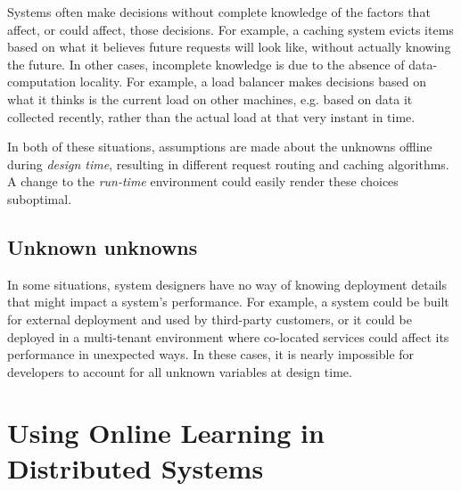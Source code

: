 \documentclass[a4paper,twocolumn]{article}
\newcommand{\ignore}[1]{}
\begin{document}
Systems often make decisions without complete knowledge of the factors that
affect, or could affect, those decisions.  For example, a caching system evicts
items based on what it believes future requests will look like, without actually
knowing the future.  In other cases, incomplete knowledge is due to the absence
of data-computation locality.  For example, a load balancer makes decisions
based on what it thinks is the current load on other machines, e.g. based on
data it collected recently, rather than the actual load at that very instant in
time.

In both of these situations, assumptions are made about the unknowns offline
during \emph{design time}, resulting in different request routing and caching
algorithms. A change to the \emph{run-time} environment could easily render
these choices suboptimal.

\ignore{
Online learning has the potential to make these decisions online, based on current contexts,
and can be nimble in adapting to any changes to the run-time
environment.
}

\subsection*{Unknown unknowns}

In some situations, system designers have no way of knowing deployment details
that might impact a system's performance. For example, a system could be built
for external deployment and used by third-party customers, or it could be
deployed in a multi-tenant environment where co-located services could affect
its performance in unexpected ways. In these cases, it is nearly impossible for
developers to account for all unknown variables at design time.

\ignore{
However, an ML agent is able to make
decisions online based on inputs from the run-time environment.
}
\ignore{
To be clear, ML has been used in some distributed systems. However, it has not
been used in a general way to make online decisions about core distributed
systems implementation details. We advocate that developers should focus on
high-level objectives of their system, and use online ML to make to compute the
specifics (such as policies for request routing, replica placement, or failure
monitoring) at run-time based on observed metrics.
}

\section{Using Online Learning in Distributed Systems}
\end{document}
